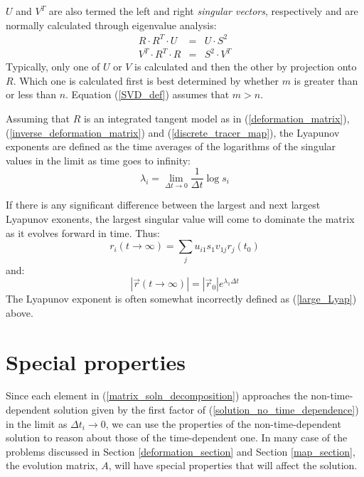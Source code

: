 \documentclass[11pt]{article}
\begin{document}
$U$ and $V^T$ are also termed the left and right {\it singular vectors}, 
respectively and are normally calculated through eigenvalue analysis:
\begin{eqnarray}
R\cdot R^T \cdot U & = & U\cdot S^2 \\
V^T \cdot R^T \cdot R & = & S^2 \cdot V^T
\end{eqnarray}
Typically, only one of $U$ or $V$ is calculated and then the other by projection
onto $R$.  Which one is calculated first is best determined by whether $m$
is greater than or less than $n$.  Equation (\ref{SVD_def}) assumes that 
$m>n$.

Assuming that $R$ is an integrated tangent model as in 
(\ref{deformation_matrix}), (\ref{inverse_deformation_matrix})
and (\ref{discrete_tracer_map}), 
the Lyapunov exponents are defined as the time averages of the logarithms
of the singular values in the limit as time goes to infinity:
\begin{equation}
\lambda_i=\lim_{\Delta t \rightarrow 0} \frac{1}{\Delta t} \log s_i
\end{equation}

If there is any significant difference between the largest and next largest
Lyapunov exonents, the largest singular value will come to dominate the matrix
as it evolves forward in time.  Thus:
\begin{equation}
r_i(t \rightarrow \infty) = \sum_j u_{i1} s_1 v_{1j} r_j(t_0)
\end{equation}
and:
\begin{equation}
|\vec r(t \rightarrow \infty)| = |\vec r_0| e^{\lambda_1 \Delta t}
\label{large_Lyap}
\end{equation}
The Lyapunov exponent is often somewhat incorrectly defined as
(\ref{large_Lyap}) above.

\section{Special properties}

Since each element in (\ref{matrix_soln_decomposition}) approaches the
non-time-dependent solution given by the first factor of 
(\ref{solution_no_time_dependence}) in the limit as $\Delta t_i\rightarrow 0$, 
we can use the properties of the non-time-dependent solution to
reason about those of the time-dependent one.
In many case of the problems discussed in Section \ref{deformation_section}
and Section \ref{map_section}, the evolution matrix, $A$, will have
special properties that will affect the solution.
\end{document}

